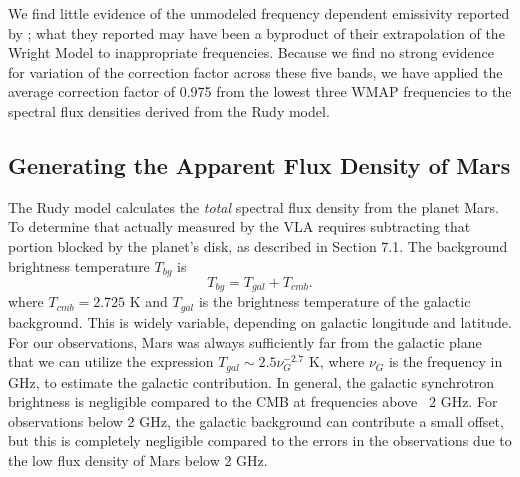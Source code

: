 \documentclass{aastex}
\begin{document}
We find little evidence of the unmodeled frequency dependent
emissivity reported by \citet{Wei11}; what they reported may have been
a byproduct of their extrapolation of the Wright Model to
inappropriate frequencies.  Because we find no strong evidence for
variation of the correction factor across these five bands, we have
applied the average correction factor of 0.975 from the lowest three
WMAP frequencies to the spectral flux densities derived from the Rudy
model.


\subsection{Generating the Apparent Flux Density of Mars}

The Rudy model calculates the {\sl total} spectral flux density from
the planet Mars.  To determine that actually measured by the VLA
requires subtracting that portion blocked by the planet's disk, as
described in Section 7.1.  The background brightness temperature $T_{bg}$ is
\begin{equation}
      T_{bg} = T_{gal} + T_{cmb}.
\end{equation}
where $T_{cmb} = 2.725$ K and $T_{gal}$ is the brightness temperature
of the galactic background.  This is widely variable, depending on
galactic longitude and latitude.  For our observations, Mars was
always sufficiently far from the galactic plane that we can utilize
the expression $T_{gal}\sim 2.5\nu_G^{-2.7 }$ K, where $\nu_G$ is the
frequency in GHz, to estimate the galactic contribution.  In general,
the galactic synchrotron brightness is negligible compared to the CMB
at frequencies above ~2 GHz.  For observations below 2 GHz, the
galactic background can contribute a small offset, but this is
completely negligible compared to the errors in the observations due
to the low flux density of Mars below 2 GHz.  
\end{document}
